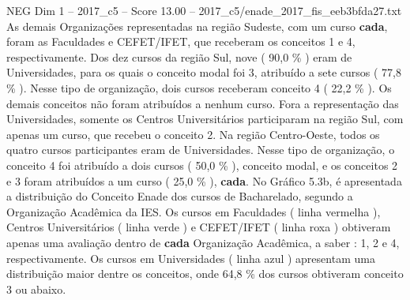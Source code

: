 \begin{textsample}{NEG Dim 1 – 2017\_c5 – Score 13.00 – 2017\_c5/enade\_2017\_fis\_eeb3bfda27.txt}
As demais Organizações representadas na região Sudeste, com um curso \textbf{cada}, foram as Faculdades e CEFET/IFET, que receberam os conceitos 1 e 4, respectivamente.
Dos dez cursos da região Sul, nove ( 90,0 \% ) eram de Universidades, para os quais o conceito modal foi 3, atribuído a sete cursos ( 77,8 \% ).
Nesse tipo de organização, dois cursos receberam conceito 4 ( 22,2 \% ).
Os demais conceitos não foram atribuídos a nenhum curso.
Fora a representação das Universidades, somente os Centros Universitários participaram na região Sul, com apenas um curso, que recebeu o conceito 2.
Na região Centro-Oeste, todos os quatro cursos participantes eram de Universidades.
Nesse tipo de organização, o conceito 4 foi atribuído a dois cursos ( 50,0 \% ), conceito modal, e os conceitos 2 e 3 foram atribuídos a um curso ( 25,0 \% ), \textbf{cada}.
No Gráfico 5.3b, é apresentada a distribuição do Conceito Enade dos cursos de Bacharelado, segundo a Organização Acadêmica da IES.
Os cursos em Faculdades ( linha vermelha ), Centros Universitários ( linha verde ) e CEFET/IFET ( linha roxa ) obtiveram apenas uma avaliação dentro de \textbf{cada} Organização Acadêmica, a saber : 1, 2 e 4, respectivamente.
Os cursos em Universidades ( linha azul ) apresentam uma distribuição maior dentre os conceitos, onde 64,8 \% dos cursos obtiveram conceito 3 ou abaixo.

\end{textsample}
